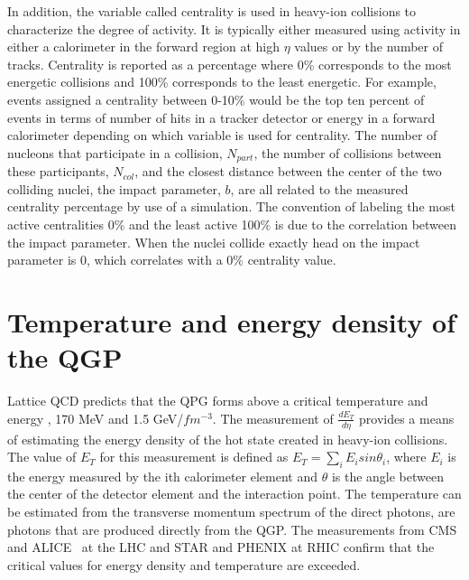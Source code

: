    In addition, the variable called centrality is used in heavy-ion 
      collisions to characterize the degree of activity. 
    It is typically either measured using activity in either a calorimeter in
      the forward region at high $\eta$ values or by the number of tracks.
    Centrality is reported as a percentage where 0\% corresponds to the most 
      energetic collisions and 100\% corresponds to the least energetic.
    For example, events assigned a centrality between 0-10\% would be the 
      top ten percent of events in terms of number of hits in a tracker 
      detector or energy in a forward calorimeter depending on which 
      variable is used for centrality. 
    The number of nucleons that participate in a collision, $N_{part}$,
      the number of collisions between these participants, $N_{col}$, and the
      closest distance between the center of the two colliding nuclei, the 
      impact parameter, $b$, are all related to the measured centrality 
      percentage by use of a simulation. 
    The convention of labeling the most active centralities 0\% and the least
      active 100\% is due to the correlation between the impact parameter.
    When the nuclei collide exactly head on the impact parameter is 0, which 
      correlates with a 0\% centrality value. 

  \section{Temperature and energy density of the QGP}
    Lattice QCD predicts that the QPG forms above a critical temperature and 
      energy \DIFdelbegin {}\DIFdelend \DIFaddbegin {}\DIFaddend , 170 MeV and 1.5 GeV/$fm$$^{-3}$\DIFdelbegin \DIFdel{\mbox{%
\cite{}
}%
}\DIFdelend \DIFaddbegin {}\DIFaddend .
    The measurement of \DIFdelbegin {}\DIFdelend $\frac{dE_{T}}{d\eta}$ provides a means of 
      estimating the energy density of the hot state created in heavy-ion
      collisions. 
    The value of $E_{T}$ for this measurement is defined as 
      $E_{T}=\sum_{i}E_{i}sin\theta_{i}$, where $E_{i}$ is the energy measured 
      by the ith calorimeter element and $\theta$ is the angle between the 
      center of the detector element and the interaction point. 
    The temperature can be estimated from the transverse momentum 
      spectrum of the direct photons, \DIFdelbegin {}\DIFdelend \DIFaddbegin {}\DIFaddend are photons that are produced 
      directly from the QGP.
    The measurements from CMS and ALICE~\cite{Aamodt:2008zz} at the LHC and STAR and PHENIX at RHIC
      confirm that the critical values for energy density and temperature are
      exceeded.

